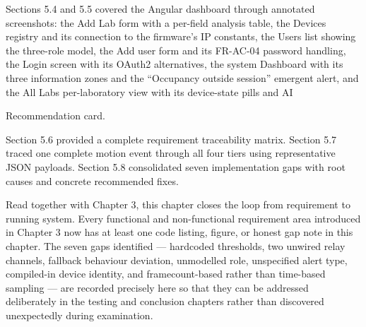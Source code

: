 Sections 5.4 and 5.5 covered the Angular dashboard through annotated screenshots:
the Add Lab form with a per-ﬁeld analysis table, the Devices registry and its connection
to the ﬁrmware's IP constants, the Users list showing the three-role model, the Add user
form and its FR-AC-04 password handling, the Login screen with its OAuth2 alternatives,
the system Dashboard with its three information zones and the ``Occupancy outside session'' emergent alert, and the All Labs per-laboratory view with its device-state pills and AI



Recommendation card.

Section 5.6 provided a complete requirement traceability matrix. Section 5.7 traced
one complete motion event through all four tiers using representative JSON payloads. Section 5.8 consolidated seven implementation gaps with root causes and concrete recommended ﬁxes.

Read together with Chapter 3, this chapter closes the loop from requirement to running
system. Every functional and non-functional requirement area introduced in Chapter 3
now has at least one code listing, ﬁgure, or honest gap note in this chapter. The seven
gaps identiﬁed --- hardcoded thresholds, two unwired relay channels, fallback behaviour
deviation, unmodelled role, unspeciﬁed alert type, compiled-in device identity, and framecount-based rather than time-based sampling --- are recorded precisely here so that they
can be addressed deliberately in the testing and conclusion chapters rather than discovered
unexpectedly during examination.




